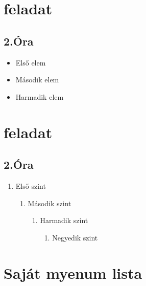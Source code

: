 \documentclass[12]{article}
\begin{document}
\section{feladat}
\subsection{2.Óra}


\begin{itemize}
\item Első elem
\item Második elem 
\item Harmadik elem
\end{itemize}
\newpage

\section{feladat}
\subsection{2.Óra}


\begin{enumerate}
    \item Első szint
    \begin{enumerate}
        \item Második szint
        \begin{enumerate}[label=\alph*),ref=\alph*]
            \item Harmadik szint
            \begin{enumerate}
                \item Negyedik szint
                \end{enumerate}
            \end{enumerate}
        \end{enumerate}
    \end{enumerate}
   


\section{Saját myenum lista}
\end{document}
